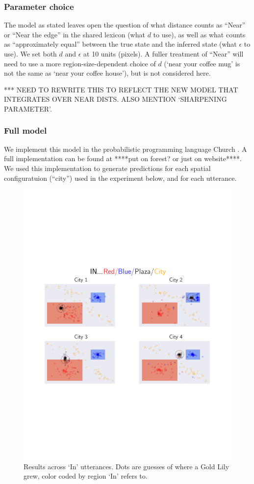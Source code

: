 \documentclass[10pt,letterpaper]{article}
\begin{document}
\subsubsection{Parameter choice} The model as stated leaves open the question of what distance counts as ``Near'' or ``Near the edge'' in the shared lexicon (what $d$ to use), as well as what counts as ``approximately equal'' between the true state and the inferred state (what $\epsilon$ to use). We set both $d$ and $\epsilon$ at 10 units (pixels). A fuller treatment of ``Near'' will need to use a more region-size-dependent choice of $d$ (`near your coffee mug' is not the same as `near your coffee house'), but is not considered here. 

*** NEED TO REWRITE THIS TO REFLECT THE NEW MODEL THAT INTEGRATES OVER NEAR DISTS. ALSO MENTION `SHARPENING PARAMETER'.

\subsubsection{Full model} We implement this model in the probabilistic programming language Church \cite{goodman2008}. A full implementation can be found at ****put on forest? or just on website****. We used this implementation to generate predictions for each spatial configuratuion (``city'') used in the experiment below, and for each utterance.


\begin{figure}[!t]
\center
\includegraphics[width=.82\textwidth]{figures/In.pdf}
\caption{Results across `In' utterances. Dots are guesses of where a Gold Lily grew, color coded by region `In' refers to.}
\label{fig:In}
\end{figure}
\end{document}
